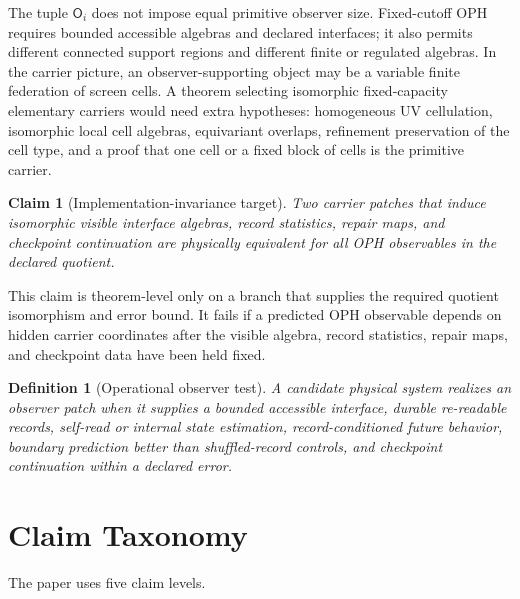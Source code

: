 \documentclass[11pt]{article}
\newtheorem{definition}[theorem]{Definition}
\newtheorem{claim}[theorem]{Claim}
\theoremstyle{remark}
\theoremstyle{plain}
\begin{document}
The tuple \(\mathsf O_i\) does not impose equal primitive observer size. Fixed-cutoff OPH requires
bounded accessible algebras and declared interfaces; it also permits different connected support
regions and different finite or regulated algebras. In the carrier picture, an observer-supporting
object may be a variable finite federation of screen cells. A theorem selecting isomorphic
fixed-capacity elementary carriers would need extra hypotheses: homogeneous UV cellulation,
isomorphic local cell algebras, equivariant overlaps, refinement preservation of the cell type, and a
proof that one cell or a fixed block of cells is the primitive carrier.

\begin{claim}[Implementation-invariance target]\label{claim:implementation-invariance}
Two carrier patches that induce isomorphic visible interface algebras, record statistics, repair
maps, and checkpoint continuation are physically equivalent for all OPH observables in the declared
quotient.
\end{claim}

This claim is theorem-level only on a branch that supplies the required quotient isomorphism and
error bound. It fails if a predicted OPH observable depends on hidden carrier coordinates after the
visible algebra, record statistics, repair maps, and checkpoint data have been held fixed.

\begin{definition}[Operational observer test]\label{def:operational-observer-test}
A candidate physical system realizes an observer patch when it supplies a bounded accessible
interface, durable re-readable records, self-read or internal state estimation, record-conditioned
future behavior, boundary prediction better than shuffled-record controls, and checkpoint
continuation within a declared error.
\end{definition}

\section{Claim Taxonomy}

The paper uses five claim levels.
\end{document}
